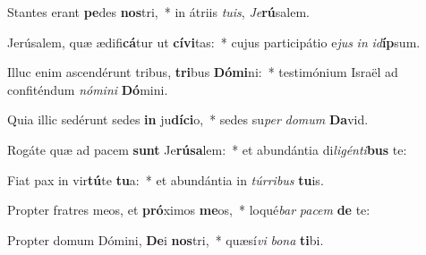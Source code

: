 \item Stantes erant \textbf{pe}des \textbf{nos}tri,~* in átriis \textit{tu}\textit{is}, \textit{Je}\textbf{rú}salem.
\item Jerúsalem, quæ ædifi\textbf{cá}tur ut \textbf{cí}\textbf{vi}tas:~* cujus participátio e\textit{jus} \textit{in} \textit{id}\textbf{íp}sum.
\item Illuc enim ascendérunt tribus, \textbf{tri}bus \textbf{Dó}\textbf{mi}ni:~* testimónium Israël ad confiténdum \textit{nó}\textit{mi}\textit{ni} \textbf{Dó}mini.
\item Quia illic sedérunt sedes \textbf{in} ju\textbf{dí}\textbf{ci}o,~* sedes su\textit{per} \textit{do}\textit{mum} \textbf{Da}vid.
\item Rogáte quæ ad pacem \textbf{sunt} Je\textbf{rú}\textbf{sa}lem:~* et abundántia di\textit{li}\textit{gén}\textit{ti}\textbf{bus} te:
\item Fiat pax in vir\textbf{tú}te \textbf{tu}a:~* et abundántia in \textit{túr}\textit{ri}\textit{bus} \textbf{tu}is.
\item Propter fratres meos, et \textbf{pró}ximos \textbf{me}os,~* loqué\textit{bar} \textit{pa}\textit{cem} \textbf{de} te:
\item Propter domum Dómini, \textbf{De}i \textbf{nos}tri,~* quæsí\textit{vi} \textit{bo}\textit{na} \textbf{ti}bi.
